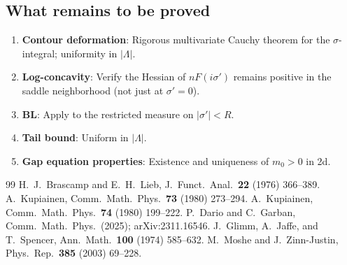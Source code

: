 \documentclass[12pt]{article}
\theoremstyle{definition}
\theoremstyle{remark}
\newcommand{\La}{\Lambda}
\begin{document}
\subsection{What remains to be proved}

\begin{enumerate}
\item \textbf{Contour deformation}: Rigorous multivariate Cauchy
  theorem for the $\sigma$-integral; uniformity in $|\La|$.
\item \textbf{Log-concavity}: Verify the Hessian of $nF(i\sigma')$
  remains positive in the saddle neighborhood (not just at $\sigma'=0$).
\item \textbf{BL}: Apply to the restricted measure on $|\sigma'|<R$.
\item \textbf{Tail bound}: Uniform in $|\La|$.
\item \textbf{Gap equation properties}: Existence and uniqueness
  of $m_0 > 0$ in 2d.
\end{enumerate}

\begin{thebibliography}{99}
 H.~J.~Brascamp and E.~H.~Lieb,
  J.~Funct.~Anal.~\textbf{22} (1976) 366--389.
 A.~Kupiainen,
  Comm.~Math.~Phys.~\textbf{73} (1980) 273--294.
 A.~Kupiainen,
  Comm.~Math.~Phys.~\textbf{74} (1980) 199--222.
 P.~Dario and C.~Garban,
  Comm.~Math.~Phys.~(2025); arXiv:2311.16546.
 J.~Glimm, A.~Jaffe, and T.~Spencer,
  Ann.~Math.~\textbf{100} (1974) 585--632.
 M.~Moshe and J.~Zinn-Justin,
  Phys.~Rep.~\textbf{385} (2003) 69--228.
\end{thebibliography}
\end{document}
